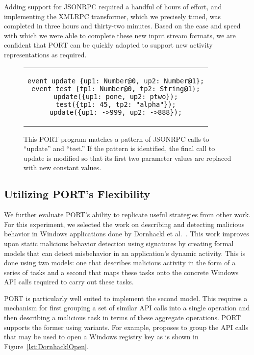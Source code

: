 Adding support for JSONRPC required a handful of hours of effort, and implementing the XMLRPC transformer,
which we precisely timed, was completed in three
hours and thirty-two minutes.  Based on the ease and speed with which we
were able to complete these new input stream formats, we are confident that PORT can be
quickly adapted to support new activity representations as required.

\begin{figure}[H]
\centering
\begin{tabular}{c}
\begin{lstlisting}
event update {up1: Number@0, up2: Number@1};
event test {tp1: Number@0, tp2: String@1};
update({up1: pone, up2: ptwo});
test({tp1: 45, tp2: "alpha"});
update({up1: ->999, up2: ->888});
\end{lstlisting}
\end{tabular}
\caption{This PORT program matches a pattern of JSONRPC calls to
  ``update'' and ``test.''  If the pattern is identified, the final call to
  update is modified so that its first two parameter values are replaced
  with new constant values.}
\label{lst:JSONProgram}
\end{figure}


\subsection{Utilizing PORT's Flexibility}
We further evaluate PORT's ability to replicate useful strategies
from other work.
For this experiment, we selected the work on
describing and detecting malicious behavior in Windows
applications done by Dornhackl et al.~\cite{Dornhackl2014}.  This work
improves upon static malicious behavior detection using signatures by
creating formal models that can detect misbehavior in an application's
dynamic activity.  This is done using two models: one that describes
malicious activity in the form of a series of tasks and a second that
maps these tasks onto the concrete Windows API calls required to carry
out these tasks.

PORT is particularly well suited to implement the second model.  This
requires a mechanism for first grouping a set of similar API calls
into a single operation and then describing a malicious task in terms of
these aggregate operations.  PORT supports the former using variants.
For example, \cite{Dornhackl2014} proposes to group the API calls that may be used to
open a Windows registry key as is shown in Figure~\ref{lst:DornhacklOpen}.

